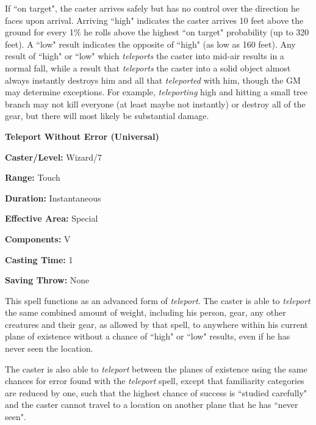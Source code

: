 \begin{multicols}{2}
If ``on target", the caster arrives safely but has no control over the direction he faces upon arrival.  Arriving ``high" indicates the caster arrives 10 feet above the ground for every 1\% he rolls above the highest ``on target" probability (up to 320 feet).  A ``low" result indicates the opposite of ``high" (as low as 160 feet).  Any result of ``high" or ``low" which \textit{teleports} the caster into mid-air results in a normal fall, while a result that \textit{teleports} the caster into a solid object almost always instantly destroys him and all that \textit{teleported} with him, though the GM may determine exceptions.  For example, \textit{teleporting} high and hitting a small tree branch may not kill everyone (at least maybe not instantly) or destroy all of the gear, but there will most likely be substantial damage.

\vspace{1em}

\noindent
\begin{minipage}{\columnwidth}

\noindent \textbf{Teleport Without Error (Universal)}

\noindent \textbf{Caster/Level:} Wizard/7

\noindent \textbf{Range:} Touch

\noindent \textbf{Duration:} Instantaneous

\noindent \textbf{Effective Area:} Special

\noindent \textbf{Components:} V

\noindent \textbf{Casting Time:} 1

\noindent \textbf{Saving Throw:} None

\end{minipage}

This spell functions as an advanced form of \textit{teleport}.  The caster is able to \textit{teleport} the same combined amount of weight, including his person, gear, any other creatures and their gear, as allowed by that spell, to anywhere within his current plane of existence without a chance of ``high" or ``low" results, even if he has never seen the location.  

The caster is also able to \textit{teleport} between the planes of existence using the same chances for error found with the \textit{teleport} spell, except that familiarity categories are reduced by one, such that the highest chance of success is ``studied carefully" and the caster cannot travel to a location on another plane that he has ``never seen".


\end{multicols}
